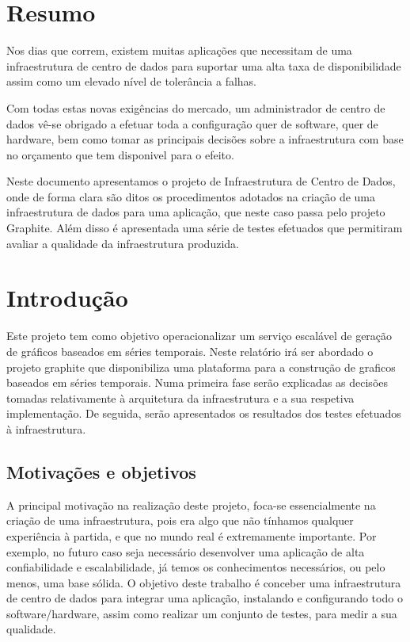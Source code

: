 \section{Resumo}
Nos dias que correm, existem muitas aplicações que necessitam de uma infraestrutura de centro de dados para suportar uma alta taxa de disponibilidade assim como um elevado nível de tolerância a falhas.

Com todas estas novas exigências do mercado, um administrador de centro de dados vê-se obrigado a efetuar toda a configuração quer de software, quer de hardware, bem como tomar as principais decisões sobre a infraestrutura com base no orçamento que tem disponivel para o efeito.

Neste documento apresentamos o projeto de Infraestrutura de Centro de Dados, onde de forma clara são ditos os procedimentos adotados na criação de uma infraestrutura de dados para uma aplicação, que neste caso passa pelo projeto Graphite. Além disso é apresentada uma série de testes efetuados que permitiram avaliar a qualidade da infraestrutura produzida.

\section{Introdução}
Este projeto tem como objetivo operacionalizar um serviço escalável de geração de gráficos baseados em séries temporais.
Neste relatório irá ser abordado o projeto graphite que disponibiliza uma plataforma para a construção de graficos baseados em séries temporais.
Numa primeira fase serão explicadas as decisões tomadas relativamente à arquitetura da infraestrutura e a sua respetiva implementação.
De seguida, serão apresentados os resultados dos testes efetuados à infraestrutura.

\subsection{Motivações e objetivos}

A principal motivação na realização deste projeto, foca-se essencialmente na criação de uma infraestrutura, pois era algo que não tínhamos qualquer experiência à partida, e que no mundo real é extremamente importante. Por exemplo, no futuro caso seja necessário desenvolver uma aplicação de alta confiabilidade e escalabilidade, já temos os conhecimentos
necessários, ou pelo menos, uma base sólida.
O objetivo deste trabalho é conceber uma infraestrutura de centro de dados para integrar uma aplicação, instalando e configurando todo o software/hardware, assim como realizar um conjunto de testes, para medir a sua qualidade.

